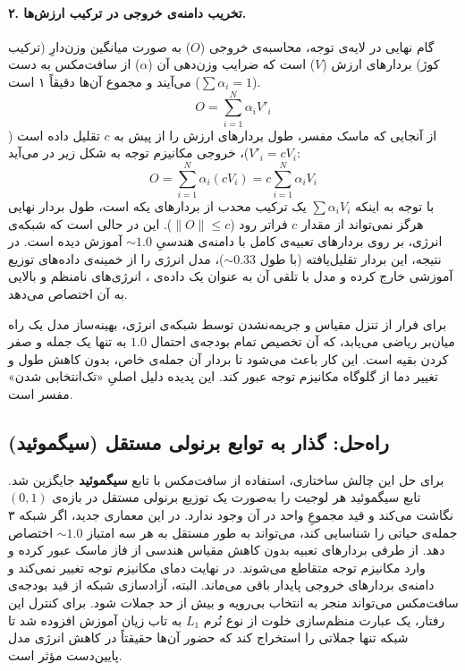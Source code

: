 \paragraph{۲. تخریب دامنه‌ی خروجی در ترکیب ارزش‌ها.}
گام نهایی در لایه‌ی توجه، محاسبه‌ی خروجی ($O$) به صورت میانگین وزن‌دارِ (ترکیب کوژ) بردارهای ارزش ($V$) است که ضرایب وزن‌دهی آن ($\alpha$) از سافت‌مکس به دست می‌آیند و مجموع آن‌ها دقیقاً ۱ است ($\sum \alpha_i = 1$).
\begin{equation}
    O = \sum_{i=1}^{N} \alpha_i V'_i
\end{equation}
از آنجایی که ماسک مفسر، طول بردارهای ارزش را از پیش به $c$ تقلیل داده است ($V'_i = c V_i$)، خروجی مکانیزم توجه به شکل زیر در می‌آید:
\begin{equation}
    O = \sum_{i=1}^{N} \alpha_i (c V_i) = c \sum_{i=1}^{N} \alpha_i V_i
\end{equation}
با توجه به اینکه $\sum \alpha_i V_i$ یک ترکیب محدب از بردارهای یکه است، طول بردار نهایی هرگز نمی‌تواند از مقدار $c$ فراتر رود ($\|O\| \le c$). این در حالی است که شبکه‌ی انرژی، بر روی بردارهای تعبیه‌ی کامل با دامنه‌ی هندسیِ $\sim 1.0$ آموزش دیده است. در نتیجه، این بردار تقلیل‌یافته (با طول $\sim 0.33$)، مدل انرژی را از خمینه‌ی داده‌های توزیع آموزشی خارج کرده و مدل با تلقی آن به عنوان یک داده‌ی ، انرژی‌های نامنظم و بالایی به آن اختصاص می‌دهد.

برای فرار از تنزل مقیاس و جریمه‌نشدن توسط شبکه‌ی انرژی، بهینه‌ساز مدل یک راه میان‌بر ریاضی می‌یابد، که آن تخصیص تمام بودجه‌ی احتمال $1.0$ به تنها یک جمله و صفر کردن بقیه است. این کار باعث می‌شود تا بردار آن جمله‌ی خاص، بدون کاهش طول و تغییر دما از گلوگاه مکانیزم توجه عبور کند. این پدیده دلیل اصلیِ «تک‌انتخابی شدن» مفسر است.


\subsection{راه‌حل: گذار به توابع برنولی مستقل (سیگموئید)}

برای حل این چالش ساختاری، استفاده از سافت‌مکس با تابع \textbf{سیگموئید} جایگزین شد. تابع سیگموئید هر لوجیت را به‌صورت یک توزیع برنولی مستقل در بازه‌ی $(0, 1)$ نگاشت می‌کند و قید مجموعِ واحد در آن وجود ندارد. در این معماری جدید، اگر شبکه ۳ جمله‌ی حیاتی را شناسایی کند، می‌تواند به طور مستقل به هر سه امتیاز $\sim 1.0$ اختصاص دهد. از طرفی بردارهای تعبیه بدون کاهش مقیاس هندسی از فاز ماسک عبور کرده و وارد مکانیزم توجه متقاطع می‌شوند. در نهایت دمای مکانیزم توجه تغییر نمی‌کند و دامنه‌ی بردارهای خروجی پایدار باقی می‌ماند. البته، آزادسازی شبکه از قید بودجه‌ی سافت‌مکس می‌تواند منجر به انتخاب بی‌رویه و بیش از حد جملات شود. برای کنترل این رفتار، یک عبارت منظم‌سازی خلوت از نوع نُرم $L_1$ به تاب زیان آموزش افزوده شد تا شبکه تنها جملاتی را استخراج کند که حضور آن‌ها حقیقتاً در کاهش انرژی مدل پایین‌دست مؤثر است.
